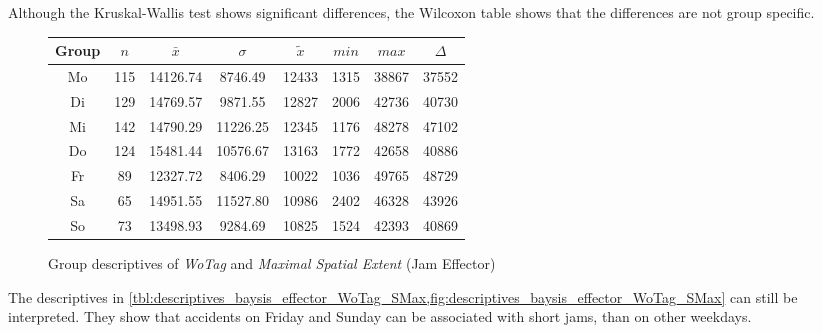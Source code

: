 Although the Kruskal-Wallis test shows significant differences, the Wilcoxon table shows that the differences are not group specific.
\begin{figure}[ht!]
	\centering
	\begin{minipage}{0.5\textwidth}
		\tiny
		\setlength{\tabcolsep}{4pt}
		\centering
		\begin{tabular}{c|c|c|c|c|c|c|c}
			\toprule
			Group & $n$ & $\bar{x}$ & $\sigma$ & $\tilde{x}$ & $min$ & $max$ & $\Delta$ \\
			\midrule
			Mo & 115 & 14126.74 & 8746.49  & 12433 & 1315 & 38867 & 37552 \\
			Di & 129 & 14769.57 & 9871.55  & 12827 & 2006 & 42736 & 40730 \\
			Mi & 142 & 14790.29 & 11226.25 & 12345 & 1176 & 48278 & 47102 \\
			Do & 124 & 15481.44 & 10576.67 & 13163 & 1772 & 42658 & 40886 \\
			Fr & 89  & 12327.72 & 8406.29  & 10022 & 1036 & 49765 & 48729 \\
			Sa & 65  & 14951.55 & 11527.80 & 10986 & 2402 & 46328 & 43926 \\
			So & 73  & 13498.93 & 9284.69  & 10825 & 1524 & 42393 & 40869 \\
			\bottomrule
		\end{tabular}
		\label{tbl:descriptives_baysis_effector_WoTag_SMax}
	\end{minipage}%
	\begin{minipage}{0.55\textwidth}
		\data
		\pgfplotstablesort[sort key=mean, sort cmp=float >]{\datasorted}{\data}
		\tiny
		\centering
		\label{fig:descriptives_baysis_effector_WoTag_SMax}
	\end{minipage}%
	\caption{Group descriptives of \textit{WoTag} and \textit{Maximal Spatial Extent} (Jam Effector)}
\end{figure}
The descriptives in \cref{tbl:descriptives_baysis_effector_WoTag_SMax,fig:descriptives_baysis_effector_WoTag_SMax} can still be interpreted. They show that accidents on Friday and Sunday can be associated with short jams, than on other weekdays.

